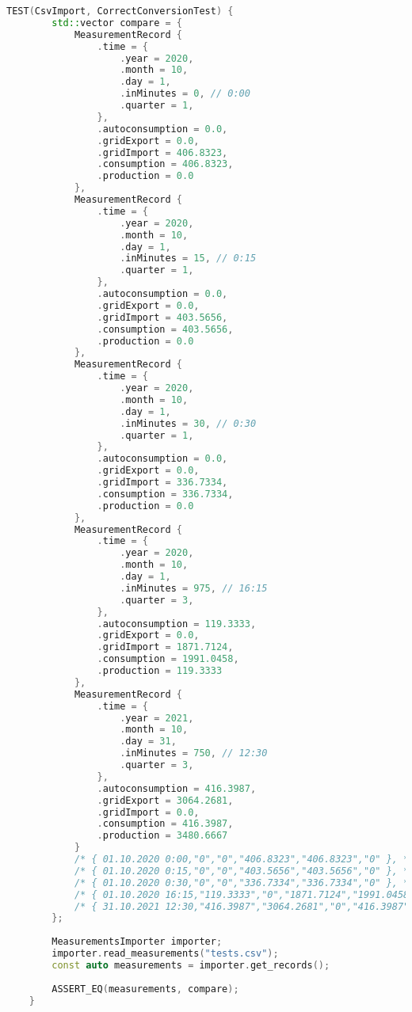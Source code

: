 \begin{lstlisting}[caption=Zawartość pliku \texttt{tests.cpp}, label={lst:googletest}, language=C++]
	TEST(CsvImport, CorrectConversionTest) {
		std::vector compare = {
			MeasurementRecord {
				.time = {
					.year = 2020,
					.month = 10,
					.day = 1,
					.inMinutes = 0, // 0:00
					.quarter = 1,
				},
				.autoconsumption = 0.0,
				.gridExport = 0.0,
				.gridImport = 406.8323,
				.consumption = 406.8323,
				.production = 0.0
			},
			MeasurementRecord {
				.time = {
					.year = 2020,
					.month = 10,
					.day = 1,
					.inMinutes = 15, // 0:15
					.quarter = 1,
				},
				.autoconsumption = 0.0,
				.gridExport = 0.0,
				.gridImport = 403.5656,
				.consumption = 403.5656,
				.production = 0.0
			},
			MeasurementRecord {
				.time = {
					.year = 2020,
					.month = 10,
					.day = 1,
					.inMinutes = 30, // 0:30
					.quarter = 1,
				},
				.autoconsumption = 0.0,
				.gridExport = 0.0,
				.gridImport = 336.7334,
				.consumption = 336.7334,
				.production = 0.0
			},
			MeasurementRecord {
				.time = {
					.year = 2020,
					.month = 10,
					.day = 1,
					.inMinutes = 975, // 16:15
					.quarter = 3,
				},
				.autoconsumption = 119.3333,
				.gridExport = 0.0,
				.gridImport = 1871.7124,
				.consumption = 1991.0458,
				.production = 119.3333
			},
			MeasurementRecord {
				.time = {
					.year = 2021,
					.month = 10,
					.day = 31,
					.inMinutes = 750, // 12:30
					.quarter = 3,
				},
				.autoconsumption = 416.3987,
				.gridExport = 3064.2681,
				.gridImport = 0.0,
				.consumption = 416.3987,
				.production = 3480.6667
			}
			/* { 01.10.2020 0:00,"0","0","406.8323","406.8323","0" }, */
			/* { 01.10.2020 0:15,"0","0","403.5656","403.5656","0" }, */
			/* { 01.10.2020 0:30,"0","0","336.7334","336.7334","0" }, */
			/* { 01.10.2020 16:15,"119.3333","0","1871.7124","1991.0458","119.3333" } */
			/* { 31.10.2021 12:30,"416.3987","3064.2681","0","416.3987","3480.6667" }*/
		};
		
		MeasurementsImporter importer;
		importer.read_measurements("tests.csv");
		const auto measurements = importer.get_records();
		
		ASSERT_EQ(measurements, compare);
	}
	

\end{lstlisting}
